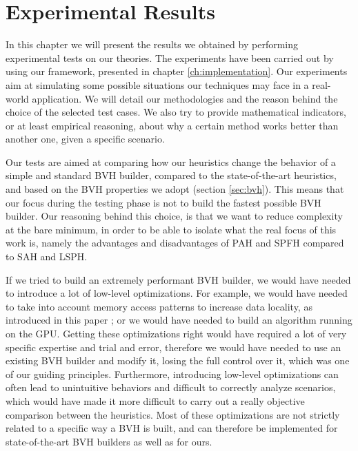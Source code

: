 \documentclass{PoliMi_MasterThesis}
\begin{document}
\chapter{Experimental Results} \label{ch:experimental_results}
In this chapter we will present the results we obtained by performing experimental tests on our theories. The experiments have been carried out by using our framework, presented in chapter \ref{ch:implementation}. Our experiments aim at simulating some possible situations our techniques may face in a real-world application. We will detail our methodologies and the reason behind the choice of the selected test cases. We also try to provide mathematical indicators, or at least empirical reasoning, about why a certain method works better than another one, given a specific scenario.

Our tests are aimed at comparing how our heuristics change the behavior of a simple and standard BVH builder, compared to the state-of-the-art heuristics, and based on the BVH properties we adopt (section \ref{sec:bvh}). This means that our focus during the testing phase is not to build the fastest possible BVH builder. Our reasoning behind this choice, is that we want to reduce complexity at the bare minimum, in order to be able to isolate what the real focus of this work is, namely the advantages and disadvantages of PAH and SPFH compared to SAH and LSPH.

If we tried to build an extremely performant BVH builder, we would have needed to introduce a lot of low-level optimizations. For example, we would have needed to take into account memory access patterns to increase data locality, as introduced in this paper \cite{cache_efficient_bvhs}; or we would have needed to build an algorithm running on the GPU. Getting these optimizations right would have required a lot of very specific expertise and trial and error, therefore we would have needed to use an existing BVH builder and modify it, losing the full control over it, which was one of our guiding principles. Furthermore, introducing low-level optimizations can often lead to unintuitive behaviors and difficult to correctly analyze scenarios, which would have made it more difficult to carry out a really objective comparison between the heuristics. Most of these optimizations are not strictly related to a specific way a BVH is built, and can therefore be implemented for state-of-the-art BVH builders as well as for ours.
\end{document}
